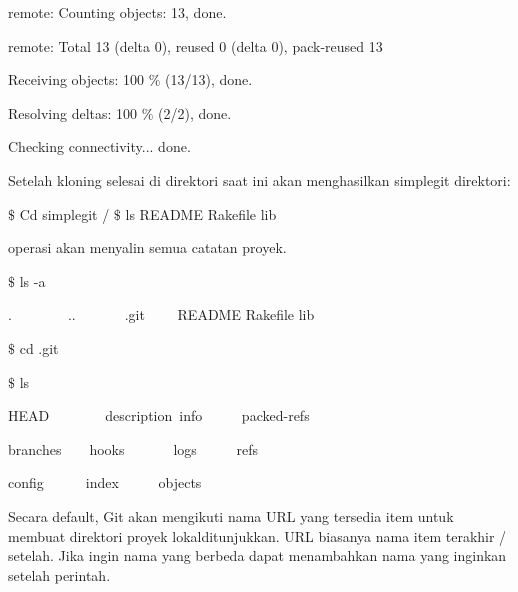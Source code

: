 \noindent 
{\fontsize{10pt}{10pt}\selectfont remote: Counting objects: 13, done.} \par
\noindent 
{\fontsize{10pt}{10pt}\selectfont remote: Total 13 (delta 0), reused 0 (delta 0), pack-reused 13} \par
\noindent 
{\fontsize{10pt}{10pt}\selectfont Receiving objects: 100 $  \%  $ (13/13), done.} \par
\noindent 
{\fontsize{10pt}{10pt}\selectfont Resolving deltas: 100 $  \%  $ (2/2), done.} \par
\noindent 
{\fontsize{10pt}{10pt}\selectfont Checking connectivity... done.} \par
\vspace{12pt}
\noindent 
Setelah kloning selesai di direktori saat ini akan menghasilkan simplegit direktori:  \par
\noindent 
{\fontsize{10pt}{10pt}\selectfont  $  \$  $ Cd simplegit /  $  \$  $ ls README Rakefile lib } \par
\noindent 
operasi akan menyalin semua catatan proyek.  \par
\vspace{12pt}
\noindent 
{\fontsize{10pt}{10pt}\selectfont  $  \$  $ ls -a} \par
\noindent 
{\fontsize{10pt}{10pt}\selectfont .~~~~~~~~..~~~~~~~.git~~~~ README   Rakefile lib} \par
\noindent 
{\fontsize{10pt}{10pt}\selectfont  $  \$  $ cd .git} \par
\noindent 
{\fontsize{10pt}{10pt}\selectfont  $  \$  $ ls} \par
\noindent 
{\fontsize{10pt}{10pt}\selectfont HEAD~~~~~~~~description~info~~~~~   packed-refs} \par
\noindent 
{\fontsize{10pt}{10pt}\selectfont branches~~~~hooks~~~~~~~logs~~~~~   refs} \par
\noindent 
{\fontsize{10pt}{10pt}\selectfont config~~~~~~index~~~~~  objects} \par
\vspace{12pt}
Secara default, Git akan mengikuti nama URL yang tersedia item untuk membuat direktori proyek lokalditunjukkan. URL biasanya nama item terakhir / setelah. Jika ingin nama yang berbeda  dapat menambahkan nama yang inginkan setelah perintah. \par
